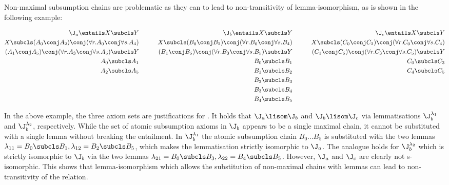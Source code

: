 Non-maximal subsumption chains are problematic as they can to lead to non-transitivity of lemma-isomorphism, as is shown in the following example:
\begin{examp}
\scriptsize
\begin{alignat*}{3}
\J_{a}  \entails X \subcls Y &\quad\quad& \J_{b}  \entails X \subcls Y &\quad\quad& \J_{c}  \entails X \subcls Y\\
X \subcls (A_{0} \conj A_{2}) \conj (\forall r.A_{0} \conj \forall s.A_{4}) &\quad\quad& X \subcls (B_{0} \conj B_{2}) \conj (\forall r.B_{0} \conj \forall s.B_{4}) &\quad\quad& X \subcls (C_{0} \conj C_{2}) \conj (\forall r.C_{0} \conj \forall s.C_{4}) \\
 (A_{1} \conj A_{5}) \conj (\forall r.A_{3} \conj \forall s.A_{5}) \subcls Y &\quad\quad&  (B_{1} \conj B_{5}) \conj (\forall r.B_{3} \conj \forall s.B_{5}) \subcls Y &\quad\quad&  (C_{1} \conj C_{5}) \conj (\forall r.C_{3} \conj \forall s.C_{5}) \subcls Y \\
 A_{0} \subcls A_{1} && B_{0} \subcls B_{1} && C_{0} \subcls C_{3} \\
 A_{2} \subcls A_{5} && B_{1} \subcls B_{2} && C_{4} \subcls C_{5} \\
 && B_{2} \subcls B_{3} && \\
 && B_{3} \subcls B_{4} && \\ 
 && B_{4} \subcls B_{5} && 
 \end{alignat*}
\end{examp}
In the above example, the three axiom sets are justifications for . It holds that $\J_{a} \lisom \J_{b}$ and $\J_{b} \lisom \J_{c}$ via lemmatisations $\J_{b}^{\lambda_{1}}$ and $\J_{b}^{\lambda_{2}}$, respectively. While the set of atomic subsumption axioms in $\J_{b}$ appears to be a single maximal chain, it cannot be substituted with a single lemma without breaking the entailment. In $\J_{b}^{\lambda_{1}}$ the atomic subsumption chain $B_{0} \ldots B_{5}$ is substituted with the two lemmas $\lambda_{11} = B_{0} \subcls B_{1}, \lambda_{12} = B_{2} \subcls B_{5}$, which makes the lemmatisation strictly isomorphic to $\J_{a}$. The analogue holds for $\J_{b}^{\lambda_{2}}$ which is strictly isomorphic to $\J_{b}$ via the two lemmas $\lambda_{21} = B_{0} \subcls B_{3}, \lambda_{22} = B_{4} \subcls B_{5}$. However, $\J_{a}$ and $\J_{c}$ are clearly not s-isomorphic. This shows that lemma-isomorphism which allows the substitution of non-maximal chains with lemmas can lead to non-transitivity of the relation. 

